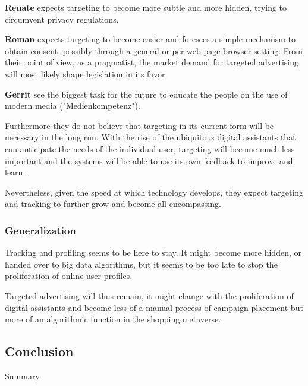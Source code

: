 \textbf{Renate} expects targeting to become more subtle and more hidden, trying to circumvent privacy regulations.

\textbf{Roman} expects targeting to become easier and foresees a simple mechanism to obtain consent, possibly through a general or per web page browser setting. From their point of view, as a pragmatist, the market demand for targeted advertising will most likely shape legislation in its favor.

\textbf{Gerrit} see the biggest task for the future to educate the people on the use of modern media ("Medienkompetenz").

Furthermore they do not believe that targeting in its current form will be necessary in the long run. With the rise of the ubiquitous digital assistants that can anticipate the needs of the individual user, targeting will become much less important and the systems will be able to use its own feedback to improve and learn.

Nevertheless, given the speed at which technology develops, they expect targeting and tracking to further grow and become all encompassing.

\subsubsection{Generalization}

Tracking and profiling seems to be here to stay. It might become more hidden, or handed over to big data algorithms, but it seems to be too late to stop the proliferation of online user profiles. 

Targeted advertising will thus remain, it might change with the proliferation of digital assistants and become less of a manual process of campaign placement but more of an algorithmic function in the shopping metaverse.

\subsection{Conclusion}

Summary
